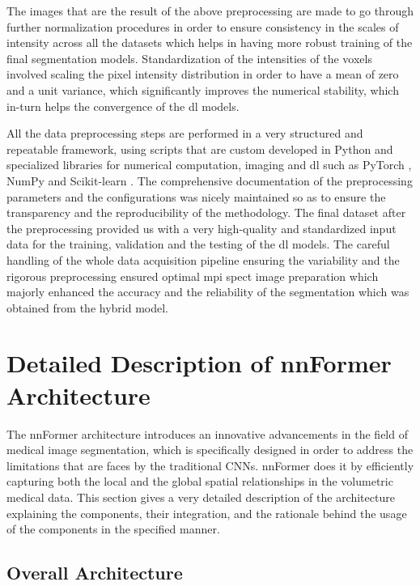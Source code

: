 The images that are the result of the above preprocessing are made to go through further normalization procedures in order to ensure consistency in the scales of intensity across all the datasets which helps in having more robust training of the final segmentation models. Standardization of the intensities of the voxels involved scaling the pixel intensity distribution in order to have a mean of zero and a unit variance, which significantly improves the numerical stability, which in-turn helps the convergence of the \gls{dl} models.

All the data preprocessing steps are performed in a very structured and repeatable framework, using scripts that are custom developed in Python and specialized libraries for numerical computation, imaging and \gls{dl} such as PyTorch \cite{NEURIPS2019_9015}, NumPy \cite{harris2020array} and Scikit-learn \cite{pedregosa2011scikit}. The comprehensive documentation of the preprocessing parameters and the configurations was nicely maintained so as to ensure the transparency and the reproducibility of the methodology. The final dataset after the preprocessing provided us with a very high-quality and standardized input data for the training, validation and the testing of the \gls{dl} models. The careful handling of the whole data acquisition pipeline ensuring the variability and the rigorous preprocessing ensured optimal \gls{mpi} \gls{spect} image preparation which majorly enhanced the accuracy and the reliability of the segmentation which was obtained from the hybrid model.

\section{Detailed Description of nnFormer Architecture}

The nnFormer architecture introduces an innovative advancements in the field of medical image segmentation, which is specifically designed in order to address the limitations that are faces by the traditional CNNs. nnFormer does it by efficiently capturing both the local and the global spatial relationships in the volumetric medical data. This section gives a very detailed description of the architecture explaining the components, their integration, and the rationale behind the usage of the components in the specified manner.

\subsection{Overall Architecture}

